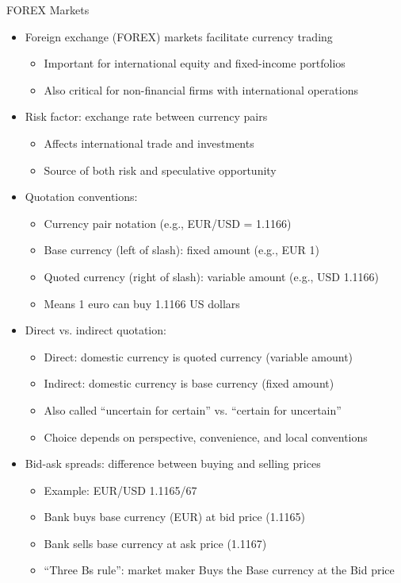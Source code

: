 \documentclass[10pt,handout]{beamer}
\begin{document}
\begin{frame}{FOREX Markets}
  \begin{itemize}[<+->]
    \item Foreign exchange (FOREX) markets facilitate currency trading
      \begin{itemize}
        \item Important for international equity and fixed-income portfolios
        \item Also critical for non-financial firms with international operations
      \end{itemize}
    \item Risk factor: exchange rate between currency pairs
      \begin{itemize}
        \item Affects international trade and investments
        \item Source of both risk and speculative opportunity
      \end{itemize}
    \item Quotation conventions:
      \begin{itemize}
        \item Currency pair notation (e.g., EUR/USD = 1.1166)
        \item Base currency (left of slash): fixed amount (e.g., EUR 1)
        \item Quoted currency (right of slash): variable amount (e.g., USD 1.1166)
        \item Means 1 euro can buy 1.1166 US dollars
      \end{itemize}
    \item Direct vs. indirect quotation:
      \begin{itemize}
        \item Direct: domestic currency is quoted currency (variable amount)
        \item Indirect: domestic currency is base currency (fixed amount)
        \item Also called ``uncertain for certain'' vs. ``certain for uncertain''
        \item Choice depends on perspective, convenience, and local conventions
      \end{itemize}
    \item Bid-ask spreads: difference between buying and selling prices
      \begin{itemize}
        \item Example: EUR/USD 1.1165/67
        \item Bank buys base currency (EUR) at bid price (1.1165)
        \item Bank sells base currency at ask price (1.1167)
        \item ``Three Bs rule'': market maker Buys the Base currency at the Bid price
      \end{itemize}
  \end{itemize}
\end{frame}
\end{document}
